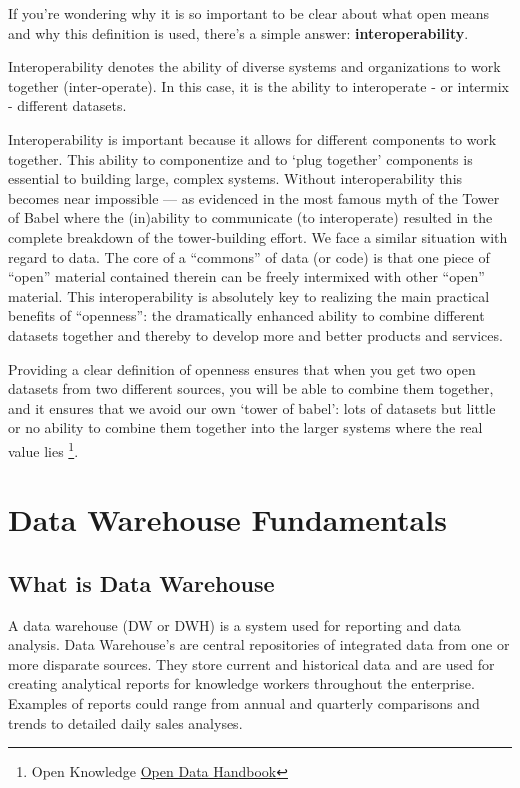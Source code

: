 \documentclass[letterpaper,10pt,oneside]{sphinxmanual}
\begin{document}
If you’re wondering why it is so important to be clear about what open means and why this definition is used, there’s a simple answer: \textbf{interoperability}.

Interoperability denotes the ability of diverse systems and organizations to work together (inter-operate). In this case, it is the ability to interoperate - or intermix - different datasets.

Interoperability is important because it allows for different components to work together. This ability to componentize and to ‘plug together’ components is essential to building large, complex systems. Without interoperability this becomes near impossible — as evidenced in the most famous myth of the Tower of Babel where the (in)ability to communicate (to interoperate) resulted in the complete breakdown of the tower-building effort.
We face a similar situation with regard to data. The core of a “commons” of data (or code) is that one piece of “open” material contained therein can be freely intermixed with other “open” material. This interoperability is absolutely key to realizing the main practical benefits of “openness”: the dramatically enhanced ability to combine different datasets together and thereby to develop more and better products and services.

Providing a clear definition of openness ensures that when you get two open datasets from two different sources, you will be able to combine them together, and it ensures that
we avoid our own ‘tower of babel’: lots of datasets but little or no ability to combine them together into the larger systems where the real value lies \footnote[4]{\sphinxAtStartFootnote%
Open Knowledge \href{http://opendatahandbook.org/guide/en/what-is-open-data/}{Open Data Handbook}
}.


\section{Data Warehouse Fundamentals}
\label{introduction:data-warehouse-fundamentals}

\subsection{What is Data Warehouse}
\label{introduction:what-is-data-warehouse}
A data warehouse (DW or DWH) is a system used for reporting and data analysis.
Data Warehouse's are central repositories of integrated data from one or more disparate sources.
They store current and historical data and are used for creating analytical reports for knowledge workers throughout the enterprise. Examples of reports could range from annual and quarterly comparisons and trends to detailed daily sales analyses.
\end{document}
